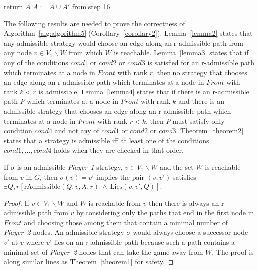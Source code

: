 \begin{algorithm}
\begin{algorithmic}[1]
		\STATE return $A$
		\ELSE
		\STATE $A := A \cup A'$ from step 16
		\ENDIF
		\ENDIF
		\ENDIF
		\ENDFOR
	\end{algorithmic}
\end{algorithm}

The following results are needed to prove the correctness of
Algorithm~\ref{alg:algorithm5}
(Corollary~\ref{corollary2}). 
Lemma~\ref{lemma2} states that any
admissible strategy would choose an edge along an r-admissible path
from any node $v \in V_{1} \backslash W$ from which $W$ is
reachable. 
Lemma~\ref{lemma3} states that if any of the conditions
$cond1$ or $cond2$ or $cond3$ is satisfied for an r-admissible path
which terminates at a node in $\mathit{Front}$ with rank $r$, then no
strategy that chooses an edge along an r-admissible path which
terminates at a node in $\mathit{Front}$ with rank $k < r$ is
admissible. 
Lemma~\ref{lemma4} states that if there is an r-admissible path $P$ which 
terminates at a node in $\mathit{Front}$ with rank $k$ and there is an
admissible strategy that chooses an edge along an
r-admissible path which terminates at a node in $\mathit{Front}$
with rank $r<k$, then $P$ must satisfy only condition $cond4$ and not 
any of $cond1$ or $cond2$ or $cond3$.
Theorem~\ref{theorem2} states that a strategy is
admissible iff at least one of the conditions $cond1,\ldots,cond4$
holds when they are checked in that order.

\begin{lemma}
	\label{lemma2}
	If $\sigma$ is an admissible \textit{Player~1} strategy, $v \in V_{1} \backslash W$ and the set $W$ is reachable from $v$ in $G$, then $\sigma(v) = v'$ implies the pair $(v,v')$ satisfies $\exists Q,r[\mathrm{rAdmissible}(Q,v,X,r) \:  \wedge \: \mathrm{Lies}(v,v',Q)]$.
\end{lemma}
\begin{proof}
	If $v \in V_{1} \backslash W$ and $W$ is reachable from $v$ then there is always an r-admissible path from $v$ by considering only the paths that end in the first node in $\mathit{Front}$ and choosing those among them that contain a minimal number of \textit{Player~2} nodes. An admissible strategy $\sigma$ would always choose a successor node $v'$ at $v$ where $v'$ lies on an r-admissible path because such a path contains a minimal set of \textit{Player~2} nodes that can take the game away from $W$. The proof is along similar lines as Theorem~\ref{theorem1} for safety. 
\end{proof}

